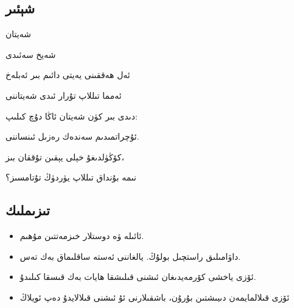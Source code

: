 \documentclass[24]{article}
\begin{document}
\newfontfamily{}
\begin{Arabic}
\newfontfamily{}
\section{\textarabic{شېئىر}}
\end{Arabic}




\newfontfamily{}
\begin{Arabic}
\begin{center}
شەيتان

شەيخ سەئىدى
\end{center}

\hspace {1in}
    ئەل ھەققىنى  يەيتى دائىم بىر ئەبلەخ
 
 \hspace {1in}
ئەمما تىللاپ تۇرار ئىدى شەيتاننى

 \hspace {1in}
دىدى بىر كۈن شەيتان ئاڭا دۇچ كىلىپ:

 \hspace {1in}
ئۇچراتمىدىم سەندەك رەزىل ئىنساننى.

 \hspace {1in}
كۆڭۈلدىغۇ خېلى يېقىن تۇققان بىز،

\hspace {1in}
نىمە بۇنداق تىللاپ يۈردۈڭ تۇتامسىز؟

\end{Arabic}



\newfontfamily{}
\begin{Arabic}
\newfontfamily{}
\section{\textarabic{تىزىملىك}}
\end{Arabic}

\begin{Arabic}
\begin{itemize}
\item ئائىلە ۋە دوستلار خىزمەتتىن مۇھىم.
\item داۋامىلىق راستچىل بولۇڭ. يالغاننى ئەستە ساقلىماق بەك تەس.
\item ئۆزى ياخشى كۆرمەيدىغان ئىشنى قىلىشقا ھايات بەك قىسقا كىلىدۇ.
\item ئۆزى قىلالمايمەن دىيىشتىن بۇرۇن، باشقىلارنى ئۇ ئىشنى قىلالايدۇ دەپ ئويلاڭ
\end{itemize}
\end{Arabic}
\end{document}
